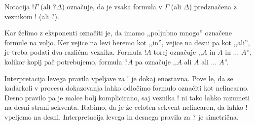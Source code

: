 \begin{definicija}
\begin{center}
\begin{bprooftree}
        \end{bprooftree}
        \begin{bprooftree}
        \end{bprooftree}
        \begin{bprooftree}
        \end{bprooftree}
    \end{center}
    Notacija $!\Gamma$ (ali $?\Delta$) označuje, da je vsaka formula v $\Gamma$ (ali $\Delta$) predznačena z veznikom ! (ali ?).
\end{definicija}

Kar želimo z eksponenti označiti je, da imamo ,,poljubno mnogo'' označene formule na voljo. Ker vejice na levi beremo kot ,,in'', vejice na desni pa kot ,,ali'', je treba podati dva različna veznika. Formula $!A$ torej označuje ,,$A$ in $A$ in $\ldots$ $A$'', kolikor kopij pač potrebujemo, formula $?A$ pa označuje ,,$A$ ali $A$ ali $\ldots$ $A$''.

Interpretacija levega pravila vpeljave za ! je dokaj enostavna. Pove le, da se kadarkoli v procesu dokazovanja lahko odločimo formulo označiti kot nelinearno. Desno pravilo pa je malce bolj komplicirano, saj veznika ! ni tako lahko razumeti na desni strani sekventa. Rabimo, da je že celoten sekvent nelinearen, da lahko ! vpeljemo na desni. Interpretacija levega in desnega pravila za ? je simetrična.
